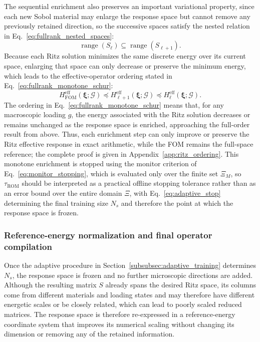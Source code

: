\documentclass[pdflatex,sn-basic,Numbered]{sn-jnl}
\newcommand{\G}{\mathcal{G}}
\newcommand{\Hfom}{H^{\mathrm{eff}}_{\mathrm{FOM}}}
\begin{document}
The sequential enrichment also preserves an important variational property,
since each new Sobol material may enlarge the response space but cannot remove
any previously retained direction, so the successive spaces satisfy the
nested relation in Eq.~\eqref{eq:fullrank_nested_spaces}:
\begin{equation}
\label{eq:fullrank_nested_spaces}
\operatorname{range}(S_\ell)
\subseteq
\operatorname{range}(S_{\ell+1}).
\end{equation}
Because each Ritz solution minimizes the same discrete energy over its current
space, enlarging that space can only decrease or preserve the minimum energy,
which leads to the effective-operator ordering stated in
Eq.~\eqref{eq:fullrank_monotone_schur}:
\begin{equation}
\label{eq:fullrank_monotone_schur}
\Hfom(\boldsymbol\xi;\G)
\preceq
H_{\ell+1}^{\mathrm{eff}}(\boldsymbol\xi;\G)
\preceq
H_{\ell}^{\mathrm{eff}}(\boldsymbol\xi;\G).
\end{equation}
The ordering in Eq.~\eqref{eq:fullrank_monotone_schur} means that, for any
macroscopic loading \(g\), the energy associated with the Ritz solution
decreases or remains unchanged as the response space is enriched, approaching
the full-order result from above. Thus, each enrichment step can only improve
or preserve the Ritz effective response in exact arithmetic, while the FOM
remains the full-space reference; the complete proof is given in
Appendix~\ref{app:ritz_ordering}. This monotone enrichment is stopped using
the monitor criterion of Eq.~\eqref{eq:monitor_stopping}, which is evaluated
only over the finite set \(\Xi_M\), so \(\tau_{\mathrm{ROM}}\) should be
interpreted as a practical offline stopping tolerance rather than as an error
bound over the entire domain \(\Xi\), with Eq.~\eqref{eq:adaptive_stop}
determining the final training size \(N_s\) and therefore the point at which
the response space is frozen.

\subsubsection{Reference-energy normalization and final operator compilation}
\label{subsubsec:reference_energy}

Once the adaptive procedure in Section~\ref{subsubsec:adaptive_training}
determines \(N_s\), the response space is frozen and no further microscopic
directions are added. Although the resulting matrix \(S\) already spans the
desired Ritz space, its columns come from different materials and loading
states and may therefore have different energetic scales or be closely
related, which can lead to poorly scaled reduced matrices. The response space
is therefore re-expressed in a reference-energy coordinate system that
improves its numerical scaling without changing its dimension or removing any
of the retained information.
\end{document}
